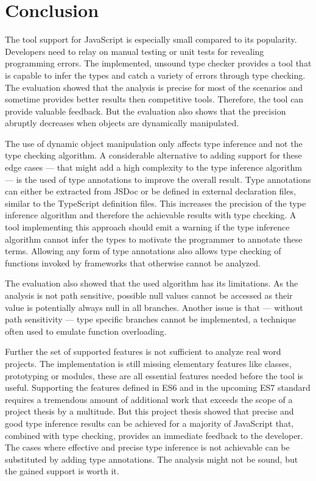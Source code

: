 \section{Conclusion}\label{sec:conclusion}
The tool support for JavaScript is especially small compared to its popularity. Developers need to relay on manual testing or unit tests for revealing programming errors. The implemented, unsound type checker provides a tool that is capable to infer the types and catch a variety of errors through type checking. The evaluation showed that the analysis is precise for most of the scenarios and sometime provides better results then competitive tools. Therefore, the tool can provide valuable feedback. But the evaluation also shows that the precision abruptly decreases when objects are dynamically manipulated. 

The use of dynamic object manipulation only affects type inference and not the type checking algorithm. A considerable alternative to adding support for these edge cases --- that might add a high complexity to the type inference algorithm --- is the used of type annotations to improve the overall result. Type annotations can either be extracted from JSDoc or be defined in external declaration files, similar to the TypeScript definition files. This increases the precision of the type inference algorithm and therefore the achievable results with type checking. A tool implementing this approach should emit a warning if the type inference algorithm cannot infer the types to motivate the programmer to annotate these terms. Allowing any form of type annotations also allows type checking of functions invoked by frameworks that otherwise cannot be analyzed. 

The evaluation also showed that the used algorithm has its limitations. As the analysis is not path sensitive, possible null values cannot be accessed as their value is potentially always null in all branches. Another issue is that --- without path sensitivity --- type specific branches cannot be implemented, a technique often used to emulate function overloading. 

Further the set of supported features is not sufficient to analyze real word projects. The implementation is still missing elementary features like classes, prototyping or modules, these are all essential features needed before the tool is useful.  Supporting the features defined in ES6 and in the upcoming ES7 standard requires a tremendous amount of additional work that exceeds the scope of a project thesis by a multitude. But this project thesis showed that precise and good type inference results can be achieved for a majority of JavaScript that, combined with type checking, provides an immediate feedback to the developer. The cases where effective and precise type inference is not achievable can be substituted by adding type annotations. The analysis might not be sound, but the gained support is worth it.